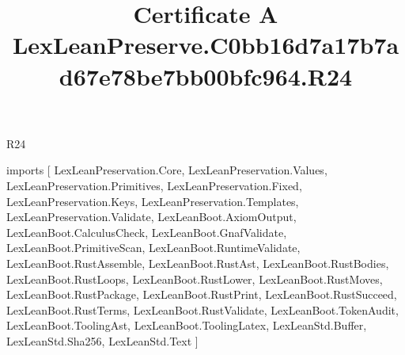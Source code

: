 \begin{lexlean}{R24}
\title{Certificate A LexLeanPreserve.C0bb16d7a17b7ad67e78be7bb00bfc964.R24}
\begin{coremodule}
imports [
  LexLeanPreservation.Core,
  LexLeanPreservation.Values,
  LexLeanPreservation.Primitives,
  LexLeanPreservation.Fixed,
  LexLeanPreservation.Keys,
  LexLeanPreservation.Templates,
  LexLeanPreservation.Validate,
  LexLeanBoot.AxiomOutput,
  LexLeanBoot.CalculusCheck,
  LexLeanBoot.GnafValidate,
  LexLeanBoot.PrimitiveScan,
  LexLeanBoot.RuntimeValidate,
  LexLeanBoot.RustAssemble,
  LexLeanBoot.RustAst,
  LexLeanBoot.RustBodies,
  LexLeanBoot.RustLoops,
  LexLeanBoot.RustLower,
  LexLeanBoot.RustMoves,
  LexLeanBoot.RustPackage,
  LexLeanBoot.RustPrint,
  LexLeanBoot.RustSucceed,
  LexLeanBoot.RustTerms,
  LexLeanBoot.RustValidate,
  LexLeanBoot.TokenAudit,
  LexLeanBoot.ToolingAst,
  LexLeanBoot.ToolingLatex,
  LexLeanStd.Buffer,
  LexLeanStd.Sha256,
  LexLeanStd.Text
]


\end{coremodule}
\end{lexlean}
